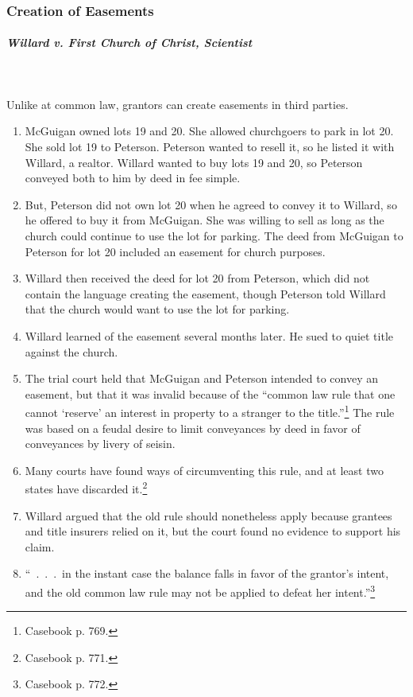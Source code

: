 \subsubsection{Creation of Easements}

\paragraph{\emph{Willard v. First Church of Christ, Scientist}}
~\\\\
Unlike at common law, grantors can create easements in third parties.

\begin{enumerate}
    \item McGuigan owned lots 19 and 20. She allowed churchgoers to park in 
    lot 20. She sold lot 19 to Peterson. Peterson wanted to resell it, so he 
    listed it with Willard, a realtor. Willard wanted to buy lots 19 and 20, 
    so Peterson conveyed both to him by deed in fee simple.
    \item But, Peterson did not own lot 20 when he agreed to convey it to 
    Willard, so he offered to buy it from McGuigan. She was willing to sell 
    as long as the church could continue to use the lot for parking. The deed 
    from McGuigan to Peterson for lot 20 included an easement for church 
    purposes.
    \item Willard then received the deed for lot 20 from Peterson, which did 
    not contain the language creating the easement, though Peterson told 
    Willard that the church would want to use the lot for parking.
    \item Willard learned of the easement several months later. He sued to 
    quiet title against the church.
    \item The trial court held that McGuigan and Peterson intended to convey 
    an easement, but that it was invalid because of the ``common law rule that 
    one cannot `reserve' an interest in property to a stranger to the 
    title.''\footnote{Casebook p. 769.} The rule was based on a feudal desire 
    to limit conveyances by deed in favor of conveyances by livery of seisin.
    \item Many courts have found ways of circumventing this rule, and at least 
    two states have discarded it.\footnote{Casebook p. 771.}
    \item Willard argued that the old rule should nonetheless apply because 
    grantees and title insurers relied on it, but the court found no evidence 
    to support his claim.
    \item ``~.~.~.~in the instant case the balance falls in favor of the 
    grantor's intent, and the old common law rule may not be applied to defeat 
    her intent.''\footnote{Casebook p. 772.}
\end{enumerate}

